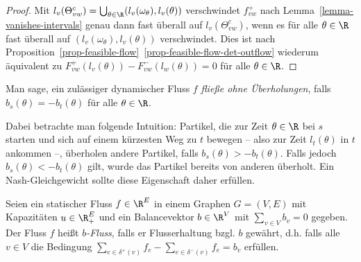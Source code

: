 \begin{proof}
	Mit $l_v(\Theta_{vw}^c) = \bigcup_{\theta\in\R}(l_v(\omega_\theta),l_v(\theta))$ verschwindet $f_{vw}^+$ nach Lemma~\ref{lemma-vanishes-intervals} genau dann fast überall auf $l_v(\Theta_{vw}^c)$, wenn es für alle $\theta\in\R$ fast überall auf $(l_v(\omega_\theta),l_v(\theta))$ verschwindet.
	Dies ist nach Proposition~\ref{prop-feasible-flow}~\ref{prop-feasible-flow-det-outflow} wiederum äquivalent zu
	$F_{vw}^+(l_v(\theta))-F_{vw}^-(l_w(\theta))=0$ für alle $\theta\in\R$.
\end{proof}

\begin{definition}
	Man sage, ein zulässiger dynamischer Fluss $f$ \emph{fließe ohne Überholungen}, falls $b_s(\theta) = -b_t(\theta)$ für alle $\theta\in\R$.
\end{definition}

Dabei betrachte man folgende Intuition:
 Partikel, die zur Zeit $\theta\in\R$ bei $s$ starten und sich auf einem kürzesten Weg zu $t$ bewegen  -- also zur Zeit $l_t(\theta)$ in $t$ ankommen --, überholen andere Partikel, falls $b_s(\theta) > -b_t(\theta)$.
Falls jedoch $b_s(\theta) < - b_t(\theta)$ gilt, wurde das Partikel bereits von anderen überholt.
Ein Nash-Gleichgewicht sollte diese Eigenschaft daher erfüllen.

\begin{definition}
	Seien ein statischer Fluss $f \in \R^E$ in einem Graphen $G=(V,E)$ mit Kapazitäten $u\in \R_+^E$ und ein Balancevektor $b\in\R^V$ mit $\sum_{v\in V} b_v = 0$ gegeben.
	Der Fluss $f$ heißt \emph{$b$-Fluss}, falls er Flusserhaltung bzgl. $b$ gewährt, d.h. falls alle $v\in V$ die Bedingung $\sum_{e\in\delta^+(v)}f_e - \sum_{e\in\delta^-(v)}f_e = b_v$ erfüllen.
\end{definition}

